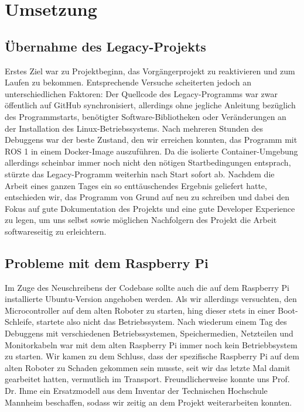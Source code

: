 \section{Umsetzung}

\subsection{Übernahme des Legacy-Projekts}

Erstes Ziel war zu Projektbeginn, das Vorgängerprojekt zu reaktivieren und zum Laufen zu bekommen. Entsprechende Versuche scheiterten jedoch an unterschiedlichen Faktoren: Der Quellcode des Legacy-Programms war zwar öffentlich auf GitHub synchronisiert, allerdings ohne jegliche Anleitung bezüglich des Programmstarts, benötigter Software-Bibliotheken oder Veränderungen an der Installation des Linux-Betriebssystems. Nach mehreren Stunden des Debuggens war der beste Zustand, den wir erreichen konnten, das Programm mit ROS 1 in einem Docker-Image auszuführen. Da die isolierte Container-Umgebung allerdings scheinbar immer noch nicht den nötigen Startbedingungen entsprach, stürzte das Legacy-Programm weiterhin nach Start sofort ab. Nachdem die Arbeit eines ganzen Tages ein so enttäuschendes Ergebnis geliefert hatte, entschieden wir, das Programm von Grund auf neu zu schreiben und dabei den Fokus auf gute Dokumentation des Projekts und eine gute Developer Experience zu legen, um uns selbst sowie möglichen Nachfolgern des Projekt die Arbeit softwareseitig zu erleichtern.

\subsection{Probleme mit dem Raspberry Pi}

Im Zuge des Neuschreibens der Codebase sollte auch die auf dem Raspberry Pi installierte Ubuntu-Version angehoben werden. Als wir allerdings versuchten, den Microcontroller auf dem alten Roboter zu starten, hing dieser stets in einer Boot-Schleife, startete also nicht das Betriebssystem. Nach wiederum einem Tag des Debuggens mit verschiedenen Betriebssystemen, Speichermedien, Netzteilen und Monitorkabeln war mit dem alten Raspberry Pi immer noch kein Betriebbsystem zu starten. Wir kamen zu dem Schluss, dass der spezifische Raspberry Pi auf dem alten Roboter zu Schaden gekommen sein musste, seit wir das letzte Mal damit gearbeitet hatten, vermutlich im Transport. Freundlicherweise konnte uns Prof. Dr. Ihme ein Ersatzmodell aus dem Inventar der Technischen Hochschule Mannheim beschaffen, sodass wir zeitig an dem Projekt weiterarbeiten konnten.

